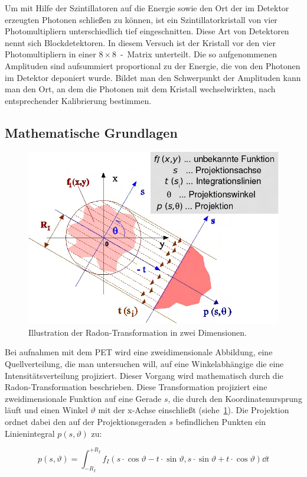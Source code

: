 \documentclass[slug=PET, room=Andreas-Schubert-Bau\,\ 424A,
supervisor=Carsten\ Bittrich, coursedate=10.\ 01.\ 2020, ngerman]{../../Lab_Report_LaTeX/lab_report}
\begin{document}
Um mit Hilfe der Szintillatoren auf die Energie sowie den Ort der im
Detektor erzeugten Photonen schließen zu können, ist ein
Szintillatorkristall von vier Photomultipliern unterschiedlich tief
eingeschnitten. Diese Art von Detektoren nennt sich
Blockdetektoren. In diesem Versuch ist der Kristall vor den vier
Photomultipliern in einer \(8\times 8\)~-~Matrix unterteilt.  Die so
aufgenommenen Amplituden sind aufsummiert proportional zu der Energie,
die von den Photonen im Detektor deponiert wurde. Bildet man den
Schwerpunkt der Amplituden kann man den Ort, an dem die Photonen mit
dem Kristall wechselwirkten, nach
entsprechender Kalibrierung bestimmen.

\subsection{Mathematische Grundlagen}
\label{sec:maths}
\begin{figure}
 \includegraphics[width=.4\textwidth]{radon.png}
 \caption{Illustration der Radon-Transformation in zwei Dimensionen.}
 \label{fig:radonillu}
\end{figure}

Bei aufnahmen mit dem PET wird eine zweidimensionale Abbildung, eine
Quellverteilung, die man untersuchen will, auf eine Winkelabh\"angige
die eine Intensitätsverteilung projiziert.  Dieser Vorgang wird
mathematisch durch die Radon-Transformation beschrieben. Diese
Transformation projiziert eine zweidimensionale Funktion auf eine
Gerade \(s\), die durch den Koordinatenursprung läuft und einen Winkel
\(\vartheta\) mit der x-Achse einschließt (siehe~\ref{fig:radonillu}).
Die Projektion ordnet dabei den auf der Projektionsgeraden \(s\)
befindlichen Punkten ein Linienintegral \(p(s, \vartheta)\) zu:

\begin{equation}\label{eq:linienint}
        p(s, \vartheta) = \int_{-R_I}^{+R_I} f_I(s \cdot \cos
        \vartheta - t \cdot \sin \vartheta, s \cdot \sin\vartheta + t
        \cdot \cos\vartheta) \dd{t}
\end{equation}
\end{document}
